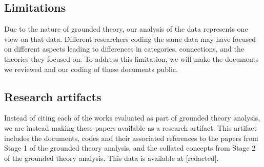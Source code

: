 \subsection{Limitations}
Due to the nature of grounded theory, our analysis of the data represents one view on that data.
Different researchers coding the same data may have focused on different aspects leading to differences in categories, connections, and the theories they focused on.
To address this limitation, we will make the documents we reviewed and our coding of those documents public.

\subsection{Research artifacts}
Instead of citing each of the works evaluated as part of grounded theory analysis, we are instead making these papers available as a research artifact.
This artifact includes the documents, codes and their associated references to the papers from Stage 1 of the grounded theory analysis, and the collated concepts from Stage 2 of the grounded theory analysis.
This data is available at [redacted].